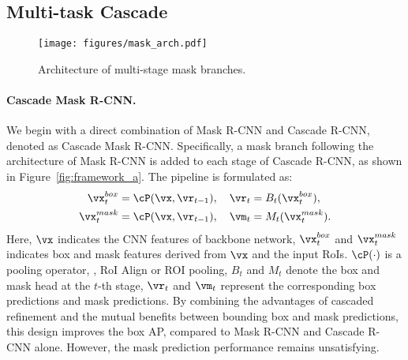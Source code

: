 \documentclass[10pt,twocolumn,letterpaper]{article}
\begin{document}
\subsection{Multi-task Cascade}
\label{subsec:multi-task}

\begin{figure}
	\centering
	\texttt{[image: figures/mask\_arch.pdf]}
	\caption{Architecture of multi-stage mask branches.}
	\label{fig:mask-arch}
\end{figure}

\paragraph{Cascade Mask R-CNN.}
We begin with a direct combination of Mask R-CNN and Cascade R-CNN,
denoted as Cascade Mask R-CNN. Specifically, a mask branch following the
architecture of Mask R-CNN is added to each stage of Cascade R-CNN, as shown in
Figure~\ref{fig:framework_a}.
The pipeline is formulated as:
\begin{equation}
	\label{equ:framework_a}
	\begin{split}
		\vx_t^{box} = \cP(\vx, \vr_{t-1})&,  \quad \vr_t = B_t(\vx_t^{box}), \\
		\vx_t^{mask} = \cP(\vx, \vr_{t-1})&,  \quad \vm_t = M_t(\vx_t^{mask}).
	\end{split}
\end{equation}
Here, $\vx$ indicates the CNN features of backbone network,
$\vx_t^{box}$ and $\vx_t^{mask}$ indicates box and mask features derived from
$\vx$ and the input RoIs.
$\cP(\cdot)$ is a pooling operator, \eg, RoI Align or ROI pooling,
$B_t$ and $M_t$ denote the box and mask head at the $t$-th stage,
$\vr_t$ and $\vm_t$ represent the corresponding box predictions and
mask predictions.
By combining the advantages of cascaded refinement and the mutual benefits
between bounding box and mask predictions, this design improves
the box AP, compared to Mask R-CNN and Cascade R-CNN alone.
However, the mask prediction performance remains unsatisfying.

\vspace{-7pt}
\end{document}
